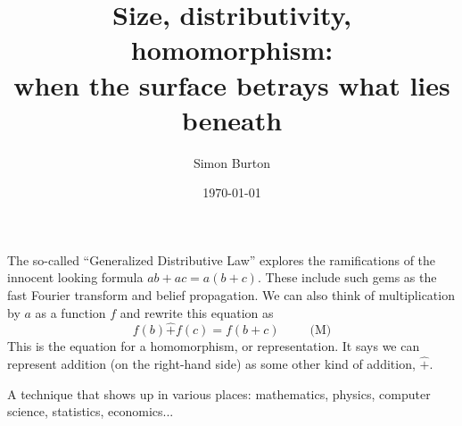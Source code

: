 \documentclass[11pt]{article}
\begin{document}
\title{Size, distributivity, homomorphism:\\
    when the surface betrays what lies beneath}

\author{Simon Burton}

\date{\today}


\maketitle


\def\N{\mathbb N}
\def\Z{\mathbb Z}
\def\R{\mathbb R}
\def\C{\mathbb C}
\def\Sets{\mathbb B}
\def\Expect{\mathbb E}
\def\Ind{\mathbb I}
\def\Complex{\mathbb{C}}
\def\GL{\mathrm{GL}}
\def\half{\frac{1}{2}}
\def\todo#1{\emph{(XXX #1 XXX)}}
\def\tensor{\otimes}
\def\tr{\mbox{tr}}
\def\det{\mbox{det}}


%
%


The so-called ``Generalized Distributive Law''
\cite{Aji2000}
explores the ramifications of the innocent looking
formula $ab+ac = a(b+c).$
These include such gems as the fast Fourier transform
and belief propagation.
We can also think of multiplication by $a$ as a function $f$
and rewrite this equation as 
$$
    f(b)\hat{+}f(c)=f(b+c) \ \ \ \ \ \ \ \ \ \ \ \mbox{(M)}
$$
This is the equation for a homomorphism, or representation.
It says we can represent addition (on the right-hand side)
as some other kind of addition, $\hat{+}.$

A technique that shows up in various places:
mathematics, physics, computer science, statistics, economics...
\end{document}
